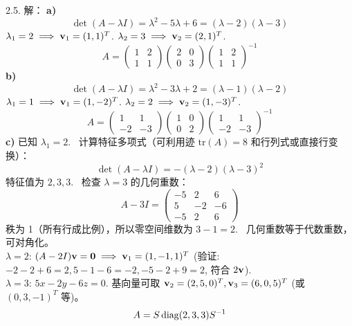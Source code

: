 \begin{exer}
2.5. 解：
\textbf{a)}
$$ \det(A-\lambda I) = \lambda^2 - 5\lambda + 6 = (\lambda-2)(\lambda-3) $$
$\lambda_1 = 2 \implies \mathbf{v}_1 = (1, 1)^T$.
$\lambda_2 = 3 \implies \mathbf{v}_2 = (2, 1)^T$.
$$ A = \begin{pmatrix} 1 & 2 \\ 1 & 1 \end{pmatrix} \begin{pmatrix} 2 & 0 \\ 0 & 3 \end{pmatrix} \begin{pmatrix} 1 & 2 \\ 1 & 1 \end{pmatrix}^{-1} $$
\textbf{b)}
$$ \det(A-\lambda I) = \lambda^2 - 3\lambda + 2 = (\lambda-1)(\lambda-2) $$
$\lambda_1 = 1 \implies \mathbf{v}_1 = (1, -2)^T$.
$\lambda_2 = 2 \implies \mathbf{v}_2 = (1, -3)^T$.
$$ A = \begin{pmatrix} 1 & 1 \\ -2 & -3 \end{pmatrix} \begin{pmatrix} 1 & 0 \\ 0 & 2 \end{pmatrix} \begin{pmatrix} 1 & 1 \\ -2 & -3 \end{pmatrix}^{-1} $$
\textbf{c)}
已知 $\lambda_1 = 2$.~
计算特征多项式（可利用迹 $\text{tr}(A) = 8$ 和行列式或直接行变换）：
$$ \det(A-\lambda I) = -(\lambda-2)(\lambda-3)^2 $$
特征值为 $2, 3, 3$.~
检查 $\lambda=3$ 的几何重数：
$$ A - 3I = \begin{pmatrix} -5 & 2 & 6 \\ 5 & -2 & -6 \\ -5 & 2 & 6 \end{pmatrix} $$
秩为 1（所有行成比例），所以零空间维数为 $3-1=2$.~
几何重数等于代数重数，可对角化。\\
$\lambda=2$: $(A-2I)\mathbf{v} = \mathbf{0} \implies \mathbf{v}_1 = (1, -1, 1)^T$ (验证: $-2-2+6=2, 5-1-6=-2, -5-2+9=2$, 符合 $2\mathbf{v}$).\\
$\lambda=3$: $5x - 2y - 6z = 0$. 基向量可取 $\mathbf{v}_2 = (2, 5, 0)^T, \mathbf{v}_3 = (6, 0, 5)^T$ (或 $(0, 3, -1)^T$ 等)。
$$ A = S \operatorname{diag}(2, 3, 3) S^{-1} $$


\end{exer}
